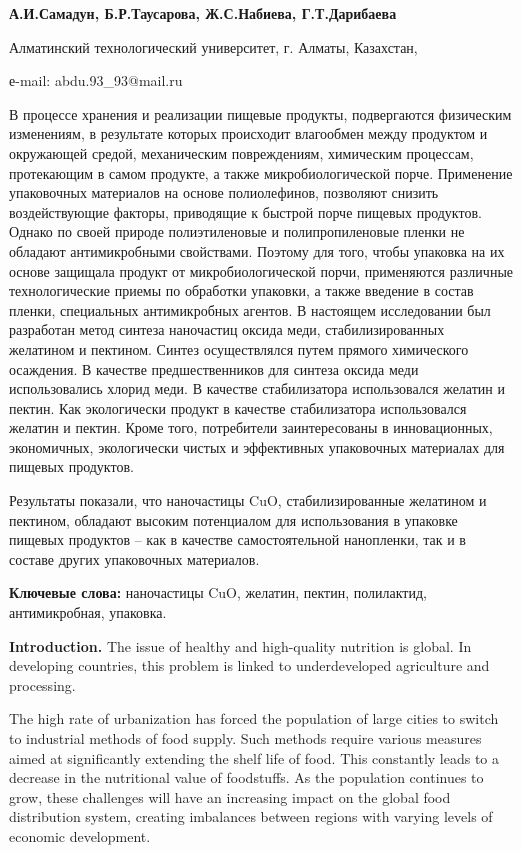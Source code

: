 {\bfseries А.И.Самадун, Б.Р.Таусарова, Ж.С.Набиева, Г.Т.Дарибаева}

Алматинский технологический университет, г. Алматы, Казахстан,

е-mail: abdu.93\_93@mail.ru

В процессе хранения и реализации пищевые продукты, подвергаются
физическим изменениям, в результате которых происходит влагообмен между
продуктом и окружающей средой, механическим повреждениям, химическим
процессам, протекающим в самом продукте, а также микробиологической
порче. Применение упаковочных материалов на основе полиолефинов,
позволяют снизить воздействующие факторы, приводящие к быстрой порче
пищевых продуктов. Однако по своей природе полиэтиленовые и
полипропиленовые пленки не обладают антимикробными свойствами. Поэтому
для того, чтобы упаковка на их основе защищала продукт от
микробиологической порчи, применяются различные технологические приемы
по обработки упаковки, а также введение в состав пленки, специальных
антимикробных агентов. В настоящем исследовании был разработан метод
синтеза наночастиц оксида меди, стабилизированных желатином и пектином.
Синтез осуществлялся путем прямого химического осаждения. В качестве
предшественников для синтеза оксида меди использовались хлорид меди. В
качестве стабилизатора использовался желатин и пектин. Как экологически
продукт в качестве стабилизатора использовался желатин и пектин. Кроме
того, потребители заинтересованы в инновационных, экономичных,
экологически чистых и эффективных упаковочных материалах для пищевых
продуктов.

Результаты показали, что наночастицы CuO, стабилизированные желатином и
пектином, обладают высоким потенциалом для использования в упаковке
пищевых продуктов -- как в качестве самостоятельной нанопленки, так и в
составе других упаковочных материалов.

{\bfseries Ключевые слова:} наночастицы CuO, желатин, пектин, полилактид,
антимикробная, упаковка.

{\bfseries Introduction.} The issue of healthy and high-quality nutrition
is global. In developing countries, this problem is linked to
underdeveloped agriculture and processing.

The high rate of urbanization has forced the population of large cities
to switch to industrial methods of food supply. Such methods require
various measures aimed at significantly extending the shelf life of
food. This constantly leads to a decrease in the nutritional value of
foodstuffs. As the population continues to grow, these challenges will
have an increasing impact on the global food distribution system,
creating imbalances between regions with varying levels of economic
development.

